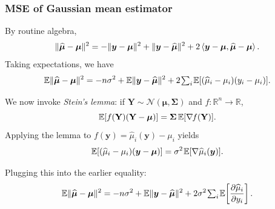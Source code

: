 \documentclass[18pt, handout]{beamer}
\newcommand{\defineTightSpacing}{%
	\setlength{\abovedisplayskip}{.25\baselineskip}%
	\setlength{\belowdisplayskip}{.25\baselineskip}%
}
\newcommand{\thinnerspace}{\mskip.5\thinmuskip}
\newcommand{\negthinnerspace}{\mskip-.5\thinmuskip}
\newcommand{\expectation}{\mathbb{E}}
\DeclareMathOperator*{\covariance}{Cov}
\newcommand{\normalDist}{\mathcal{N}}
\newcommand{\by}{\bm{y}}
\newcommand{\bmu}{\bm{\mu}}
\newcommand{\bSigma}{\bm{\Sigma}}
\begin{document}
\begin{frame}
\frametitle{M{\normalsize SE} of Gaussian mean estimator}
By routine algebra,
\begin{equation*} \defineTightSpacing%
\| \widehat{\bmu} - \bmu \|^2
	= - \| \by - \bmu \|^2 + \| \by - \widehat{\bmu} \|^2 
		+ 2 \left\langle \by - \bmu, \widehat{\bmu} - \bmu \right\rangle.
\end{equation*}
Taking expectations, we have
\begin{equation*} \defineTightSpacing%
\expectation \| \widehat{\bmu} - \bmu \|^2
	= - n \sigma^2 + \expectation \| \by - \widehat{\bmu} \|^2 
		+ 2 \thinnerspace {\textstyle \sum_i} \thinnerspace \expectation[ (\widehat{\mu}_i - \mu_i) (y_i - \mu_i) ].
\end{equation*}

We now invoke \textit{Stein's lemma}: if $\mathbf{Y} \sim \normalDist(\bmu, \bSigma)$ and $f: \mathbb{R}^n \to \mathbb{R}$, 
\begin{equation*} \defineTightSpacing%
\expectation[ f(\mathbf{Y}) (\mathbf{Y} - \bmu) ] = \bSigma \, \expectation[ \nabla \negthinnerspace f(\mathbf{Y})].
\end{equation*}
Applying the lemma to $f(\by) = \widehat{\mu}_i(\by) - \mu_i$ yields
\begin{equation*} \defineTightSpacing%
\expectation[ (\widehat{\mu}_i - \mu_i) (\by - \bmu) ] 
	= \sigma^2 \thinnerspace \expectation[ \nabla \widehat{\mu}_i(\by)].
\end{equation*}

Plugging this into the earlier equality:
\begin{equation*} \defineTightSpacing%
\expectation \| \widehat{\bmu} - \bmu \|^2
	= - n \sigma^2 + \expectation \| \by - \widehat{\bmu} \|^2 
		+ 2 \sigma^2 \thinnerspace {\textstyle \sum_i} \thinnerspace \expectation\!\left[ \frac{\partial \widehat{\mu}_i}{\partial y_i}  \right].
\end{equation*}
\end{frame}
\end{document}
